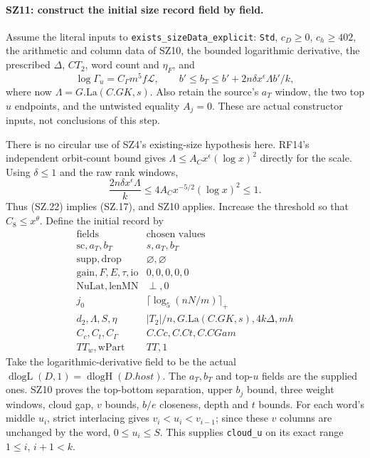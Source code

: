 \documentclass[11pt,a4paper]{article}
\numberwithin{equation}{section}
\theoremstyle{remark}\newtheorem{remark}[theorem]{Remark}
\begin{document}
\paragraph{SZ11: construct the initial size record field by field.}
Assume the literal inputs to \texttt{exists\_\allowbreak sizeData\_\allowbreak explicit}:
\texttt{Std}, $c_D\geq0$, $c_h\geq402$, the arithmetic and
column data of SZ10, the bounded logarithmic derivative, the prescribed
$\Delta$, $CT_2$, word count and $\eta_F$, and
\[
 \log\Gamma_u=C_\Gamma m^5f\mathcal L,
 \qquad
 b'\leq b_T\leq b'+2n\delta x^\epsilon\Lambda b'/k,           \tag{SZ.22}
\]
where now $\Lambda=G.\mathrm{La}(C.GK,s)$. Also retain the source's
$a_T$ window, the two top $u$ endpoints, and the untwisted equality
$A_j=0$. These are actual constructor inputs, not conclusions of
this step.

There is no circular use of SZ4's existing-size hypothesis here.
RF14's independent orbit-count bound gives
$\Lambda\leq A_Cx^\epsilon(\log x)^2$ directly for the scale.
Using $\delta\leq1$ and the raw rank windows,
\[
 \frac{2n\delta x^\epsilon\Lambda}{k}
       \leq4A_C x^{-5/2}(\log x)^2\leq1.                    \tag{SZ.23}
\]
Thus (SZ.22) implies (SZ.17), and SZ10 applies. Increase the
threshold so that $C_8\leq x^\theta$. Define the initial record by
\[
 \begin{array}{c|l}
 \text{fields}&\text{chosen values}\\\hline
 \mathrm{sc},a_T,b_T&s,a_T,b_T\\
 \mathrm{supp},\mathrm{drop}&\varnothing,\varnothing\\
 \mathrm{gain},F,E,\tau,\mathrm{io}&0,0,0,0,0\\
 \mathrm{NuLat},\mathrm{lenMN}&\perp,0\\
 j_0&\lceil\log_5(nN/m)\rceil_+\\
 d_2,\Lambda,S,\eta&|T_2|/n,G.\mathrm{La}(C.GK,s),4k\Delta,mh\\
 C_c,C_t,C_\Gamma&C.Cc,C.Ct,C.CGam\\
 TT_w,\mathrm{wPart}&TT,1
 \end{array}                                                     \tag{SZ.24}
\]
Take the logarithmic-derivative field to be the actual
$\operatorname{dlogL}(D,1)=\operatorname{dlogH}(D.host)$.
The $a_T,b_T$ and top-$u$ fields are the supplied ones. SZ10 proves
the top-bottom separation, upper $b_j$ bound, three weight windows,
cloud gap, $v$ bounds, $b/e$ closeness, depth and $t$ bounds.
For each word's middle $u_i$, strict interlacing gives
$v_i<u_i<v_{i-1}$; since these $v$ columns are unchanged by the
word, $0\leq u_i\leq S$. This supplies \texttt{cloud\_\allowbreak u} on
its exact range $1\leq i$, $i+1<k$.
\end{document}
